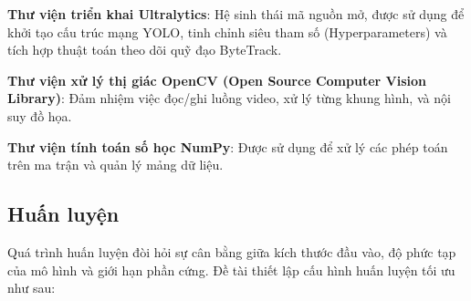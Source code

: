 \textbf{Thư viện triển khai Ultralytics}: Hệ sinh thái mã nguồn mở, được sử dụng để khởi tạo cấu trúc mạng YOLO, tinh chỉnh siêu tham số (Hyperparameters) và tích hợp thuật toán theo dõi quỹ đạo ByteTrack.

\textbf{Thư viện xử lý thị giác OpenCV (Open Source Computer Vision Library)}: Đảm nhiệm việc đọc/ghi luồng video, xử lý từng khung hình, và nội suy đồ họa.

\textbf{Thư viện tính toán số học NumPy}: Được sử dụng để xử lý các phép toán trên ma trận và quản lý mảng dữ liệu.

\subsection{Huấn luyện}

Quá trình huấn luyện đòi hỏi sự cân bằng giữa kích thước đầu vào, độ phức tạp của mô hình và giới hạn phần cứng. Đề tài thiết lập cấu hình huấn luyện tối ưu như sau:
